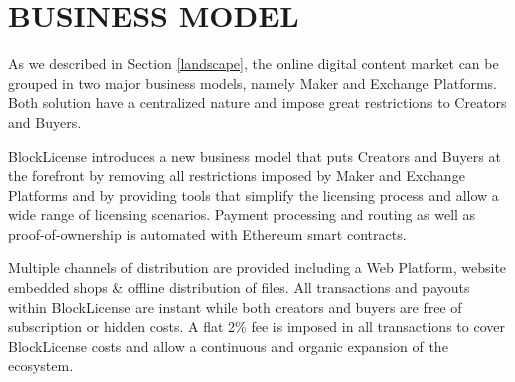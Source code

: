\newpage
\section{BUSINESS MODEL} \label{businessmodel}

As we described in Section \ref{landscape}, the online digital content market can be grouped in two major business models, namely Maker and Exchange Platforms. Both solution have a centralized nature and impose great restrictions to Creators and Buyers.

BlockLicense introduces a new business model that puts Creators and Buyers at the forefront by removing all restrictions imposed by Maker and Exchange Platforms and by  providing tools that simplify the licensing process and allow a wide range of licensing scenarios. Payment processing and routing as well as proof-of-ownership is automated with Ethereum smart contracts.

Multiple channels of distribution are provided including a Web Platform, website embedded shops \& offline distribution of files. All transactions and payouts within BlockLicense are instant while both creators and buyers are free of subscription or hidden costs. A flat 2\% fee is imposed in all transactions to cover BlockLicense costs and allow a continuous and organic expansion of the ecosystem.

